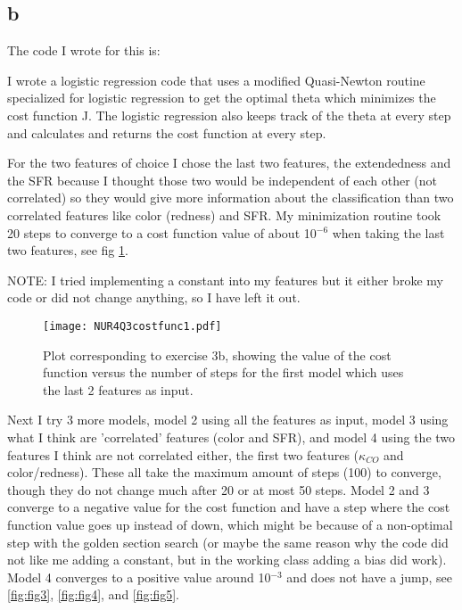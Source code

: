 \subsection*{b}

The code I wrote for this is:


I wrote a logistic regression code that uses a modified Quasi-Newton routine specialized for logistic regression to get the optimal theta which minimizes the cost function J. The logistic regression also keeps track of the theta at every step and calculates and returns the cost function at every step.

For the two features of choice I chose the last two features, the extendedness and the SFR because I thought those two would be independent of each other (not correlated) so they would give more information about the classification than two correlated features like color (redness) and SFR. 
My minimization routine took 20 steps to converge to a cost function value of about 10$^{-6}$ when taking the last two features, see fig \ref{fig:fig2}.

NOTE: I tried implementing a constant into my features but it either broke my code or did not change anything, so I have left it out.

\begin{figure}[h!]
  \centering
  \texttt{[image: NUR4Q3costfunc1.pdf]}
  \caption{Plot corresponding to exercise 3b, showing the value of the cost function versus the number of steps for the first model which uses the last 2 features as input.}
  \label{fig:fig2}
\end{figure} 

Next I try 3 more models, model 2 using all the features as input, model 3 using what I think are 'correlated' features (color and SFR), and model 4 using the two features I think are not correlated either, the first two features ($\kappa_{CO}$ and color/redness). 
These all take the maximum amount of steps (100) to converge, though they do not change much after 20 or at most 50 steps. 
Model 2 and 3 converge to a negative value for the cost function and have a step where the cost function value goes up instead of down, which might be because of a non-optimal step with the golden section search (or maybe the same reason why the code did not like me adding a constant, but in the working class adding a bias did work). Model 4 converges to a positive value around 10$^{-3}$ and does not have a jump, see \ref{fig:fig3}, \ref{fig:fig4}, and \ref{fig:fig5}.



